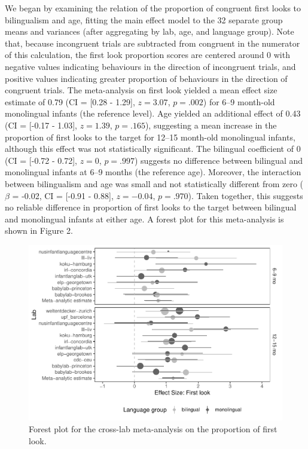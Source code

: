 \documentclass[,man,floatsintext]{apa6}
\begin{document}
We began by examining the relation of the proportion of congruent first looks to bilingualism and age, fitting the main effect model to the 32 separate group means and variances (after aggregating by lab, age, and language group). Note that, because incongruent trials are subtracted from congruent in the numerator of this calculation, the first look proportion scores are centered around 0 with negative values indicating behaviours in the direction of incongruent trials, and positive values indicating greater proportion of behaviours in the direction of congruent trials. The meta-analysis on first look yielded a mean effect size estimate of 0.79 (CI = {[}0.28 - 1.29{]}, \(z = 3.07\), \(p = .002\)) for 6--9 month-old monolingual infants (the reference level). Age yielded an additional effect of 0.43 (CI = {[}-0.17 - 1.03{]}, \(z = 1.39\), \(p = .165\)), suggesting a mean increase in the proportion of first looks to the target for 12--15 month-old monolingual infants, although this effect was not statistically significant. The bilingual coefficient of 0 (CI = {[}-0.72 - 0.72{]}, \(z = 0\), \(p = .997\)) suggests no difference between bilingual and monolingual infants at 6--9 months (the reference age). Moreover, the interaction between bilingualism and age was small and not statistically different from zero (\(\beta\) = -0.02, CI = {[}-0.91 - 0.88{]}, \(z = -0.04\), \(p = .970\)). Taken together, this suggests no reliable difference in proportion of first looks to the target between bilingual and monolingual infants at either age. A forest plot for this meta-analysis is shown in Figure 2.

\begin{figure}
\centering
\includegraphics{gaze-following-paper_files/figure-latex/fig2-1.pdf}
\caption{\label{fig:fig2}Forest plot for the cross-lab meta-analysis on the proportion of first look.}
\end{figure}
\end{document}
